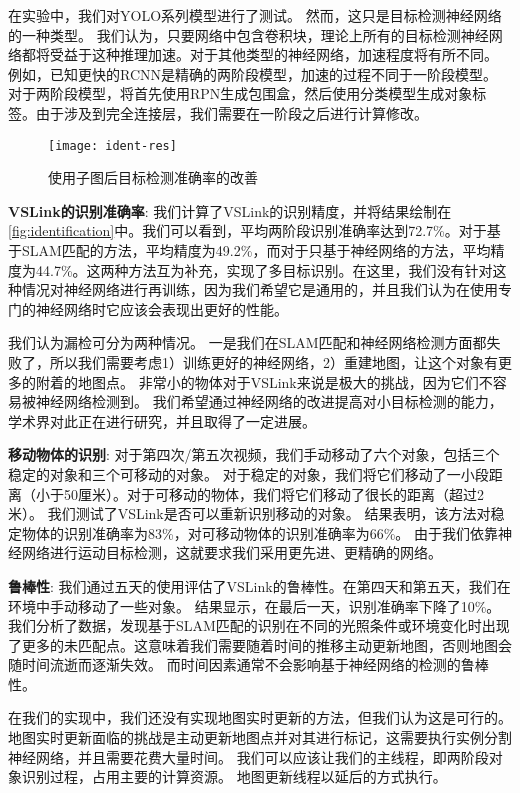 在实验中，我们对YOLO系列模型进行了测试。
然而，这只是目标检测神经网络的一种类型。
我们认为，只要网络中包含卷积块，理论上所有的目标检测神经网络都将受益于这种推理加速。对于其他类型的神经网络，加速程度将有所不同。
例如，已知更快的RCNN是精确的两阶段模型，加速的过程不同于一阶段模型。
对于两阶段模型，将首先使用RPN生成包围盒，然后使用分类模型生成对象标签。由于涉及到完全连接层，我们需要在一阶段之后进行计算修改。


\begin{figure*}[t]
	\centering
	\texttt{[image: ident-res]}
	\caption{使用子图后目标检测准确率的改善}
	\label{fig:identification}
\end{figure*}

\textbf{VSLink的识别准确率}: 
我们计算了VSLink的识别精度，并将结果绘制在\autoref{fig:identification}中。我们可以看到，平均两阶段识别准确率达到72.7\%。对于基于SLAM匹配的方法，平均精度为49.2\%，而对于只基于神经网络的方法，平均精度为44.7\%。这两种方法互为补充，实现了多目标识别。在这里，我们没有针对这种情况对神经网络进行再训练，因为我们希望它是通用的，并且我们认为在使用专门的神经网络时它应该会表现出更好的性能。

我们认为漏检可分为两种情况。
一是我们在SLAM匹配和神经网络检测方面都失败了，所以我们需要考虑1）训练更好的神经网络，2）重建地图，让这个对象有更多的附着的地图点。
非常小的物体对于VSLink来说是极大的挑战，因为它们不容易被神经网络检测到。
我们希望通过神经网络的改进提高对小目标检测的能力，学术界对此正在进行研究，并且取得了一定进展。

\textbf{移动物体的识别}: 
对于第四次/第五次视频，我们手动移动了六个对象，包括三个稳定的对象和三个可移动的对象。
对于稳定的对象，我们将它们移动了一小段距离（小于50厘米）。对于可移动的物体，我们将它们移动了很长的距离（超过2米）。
我们测试了VSLink是否可以重新识别移动的对象。
结果表明，该方法对稳定物体的识别准确率为83\%，对可移动物体的识别准确率为66\%。
由于我们依靠神经网络进行运动目标检测，这就要求我们采用更先进、更精确的网络。


\textbf{鲁棒性}: 
我们通过五天的使用评估了VSLink的鲁棒性。在第四天和第五天，我们在环境中手动移动了一些对象。
结果显示，在最后一天，识别准确率下降了10\%。我们分析了数据，发现基于SLAM匹配的识别在不同的光照条件或环境变化时出现了更多的未匹配点。这意味着我们需要随着时间的推移主动更新地图，否则地图会随时间流逝而逐渐失效。
而时间因素通常不会影响基于神经网络的检测的鲁棒性。

在我们的实现中，我们还没有实现地图实时更新的方法，但我们认为这是可行的。地图实时更新面临的挑战是主动更新地图点并对其进行标记，这需要执行实例分割神经网络，并且需要花费大量时间。
我们可以应该让我们的主线程，即两阶段对象识别过程，占用主要的计算资源。
地图更新线程以延后的方式执行。

